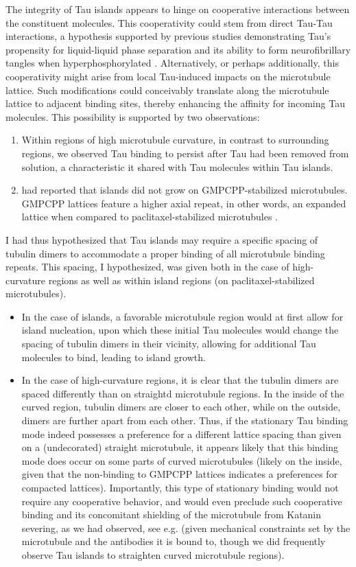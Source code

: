 The integrity of Tau islands appears to hinge on cooperative interactions between the constituent molecules. This cooperativity could stem from direct Tau-Tau interactions, a hypothesis supported by previous studies demonstrating Tau's propensity for liquid-liquid phase separation \parencite{HERNANDEZVEGA20172304} and its ability to form neurofibrillary tangles when hyperphosphorylated \parencite{iqbal2016tau}. Alternatively, or perhaps additionally, this cooperativity might arise from local Tau-induced impacts on the microtubule lattice. Such modifications could conceivably translate along the microtubule lattice to adjacent binding sites, thereby enhancing the affinity for incoming Tau molecules. This possibility is supported by two observations: 
\begin{enumerate}
    \item Within regions of high microtubule curvature, in contrast to surrounding regions, we observed Tau binding to persist after Tau had been removed from solution, a characteristic it shared with Tau molecules within Tau islands.
    \item \cite{tan2019microtubules} had reported that islands did not grow on GMPCPP-stabilized microtubules. GMPCPP lattices feature a higher axial repeat, in other words, an expanded lattice when compared to paclitaxel-stabilized microtubules .
\end{enumerate}
I had thus hypothesized that Tau islands may require a specific spacing of tubulin dimers to accommodate a proper binding of all microtubule binding repeats. This spacing, I hypothesized, was given both in the case of high-curvature regions as well as within island regions (on paclitaxel-stabilized microtubules). 
\begin{itemize}
    \item In the case of islands, a favorable microtubule region would at first allow for island nucleation, upon which these initial Tau molecules would change the spacing of tubulin dimers in their vicinity, allowing for additional Tau molecules to bind, leading to island growth.
    \item  In the case of high-curvature regions, it is clear that the tubulin dimers are spaced differently than on straightd microtubule regions. In the inside of the curved region, tubulin dimers are closer to each other, while on the outside, dimers are further apart from each other. Thus, if the stationary Tau binding mode indeed possesses a preference for a different lattice spacing than given on a (undecorated) straight microtubule, it appears likely that this binding mode does occur on some parts of curved microtubules (likely on the inside, given that the non-binding to GMPCPP lattices indicates a preferences for compacted lattices). Importantly, this type of stationary binding would not require any cooperative behavior, and would even preclude such cooperative binding and its concomitant shielding of the microtubule from Katanin severing, as we had observed, see e.g.  (given mechanical constraints set by the microtubule and the antibodies it is bound to, though we did frequently observe Tau islands to straighten curved microtubule regions). 
\end{itemize}
